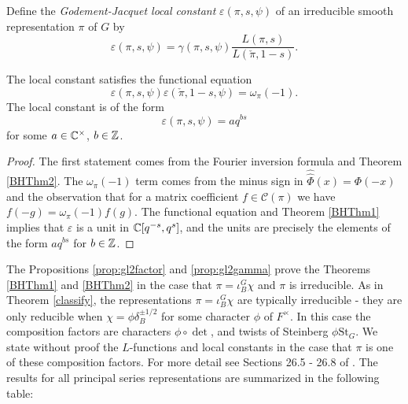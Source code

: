 \begin{defn}
    Define the \textit{Godement-Jacquet local constant} $\varepsilon(\pi,s,\psi)$ of an irreducible smooth representation $\pi$ of $G$ by 
    $$\varepsilon(\pi,s,\psi) = \gamma(\pi,s,\psi) \frac{L(\pi,s)}{L(\check{\pi},1-s)}.$$
\end{defn}

\begin{cor}
    The local constant satisfies the functional equation
    $$\varepsilon(\pi,s,\psi)\varepsilon(\check{\pi},1-s,\psi) = \omega_\pi(-1).$$
    The local constant is of the form $$\varepsilon(\pi,s,\psi) = aq^{bs}$$ for some $a \in \mathbb{C}^\times$, $b \in \mathbb{Z}$. 
\end{cor}
\begin{proof}
    The first statement comes from the Fourier inversion formula and Theorem \ref{BHThm2}. The $\omega_\pi(-1)$ term comes from the minus sign in $\hat{\hat{\Phi}}(x)=\Phi(-x)$ and the observation that for a matrix coefficient $f \in \mathcal C(\pi)$ we have $f(-g)=\omega_\pi(-1)f(g)$. The functional equation and Theorem \ref{BHThm1} implies that $\varepsilon$ is a unit in $\mathbb{C}[q^{-s},q^s]$, and the units are precisely the elements of the form $aq^{bs}$ for $b \in \mathbb{Z}$.
\end{proof}

The Propositions \ref{prop:gl2factor} and \ref{prop:gl2gamma} prove the Theorems \ref{BHThm1} and \ref{BHThm2} in the case that $\pi = \iota_B^G \chi$ and $\pi$ is irreducible. As in Theorem \ref{classify}, the representations $\pi = \iota_B^G \chi$ are typically irreducible - they are only reducible when $\chi = \phi \delta_B^{\pm 1/2}$ for some character $\phi$ of $F^\times$. In this case the composition factors are characters $\phi \circ \det$, and twists of Steinberg $\phi \mathrm{St}_G$. We state without proof the $L$-functions and local constants in the case that $\pi$ is one of these composition factors. For more detail see Sections 26.5 - 26.8 of \cite{BH1}. The results for all principal series representations are summarized in the following table:

